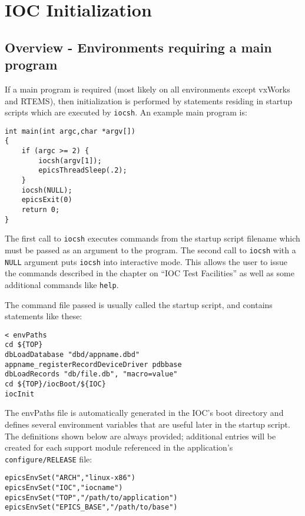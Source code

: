 \chapter{IOC Initialization}

\section{Overview - Environments requiring a main program}

If a main program is required (most likely on all environments except vxWorks and RTEMS), then initialization is performed by statements residing in startup scripts which are executed by \verb|iocsh|.
An example main program is:

\begin{verbatim}
int main(int argc,char *argv[])
{
    if (argc >= 2) {
        iocsh(argv[1]);
        epicsThreadSleep(.2);
    }
    iocsh(NULL);
    epicsExit(0)
    return 0;
}
\end{verbatim}

The first call to \verb|iocsh| executes commands from the startup script filename which must be passed as an argument to the program.
The second call to \verb|iocsh| with a \verb|NULL| argument puts \verb|iocsh| into interactive mode.
This allows the user to issue the commands described in the chapter on ``IOC Test Facilities'' as well as some additional commands like \verb|help|.

The command file passed is usually called the startup script, and contains statements like these:

\begin{verbatim}
< envPaths
cd ${TOP}
dbLoadDatabase "dbd/appname.dbd"
appname_registerRecordDeviceDriver pdbbase
dbLoadRecords "db/file.db", "macro=value"
cd ${TOP}/iocBoot/${IOC}
iocInit
\end{verbatim}

The envPaths file is automatically generated in the IOC's boot directory and defines several environment variables that are useful later in the startup script.
The definitions shown below are always provided; additional entries will be created for each support module referenced in the application's \verb|configure/RELEASE| file:

\begin{verbatim}
epicsEnvSet("ARCH","linux-x86")
epicsEnvSet("IOC","iocname")
epicsEnvSet("TOP","/path/to/application")
epicsEnvSet("EPICS_BASE","/path/to/base")
\end{verbatim}

